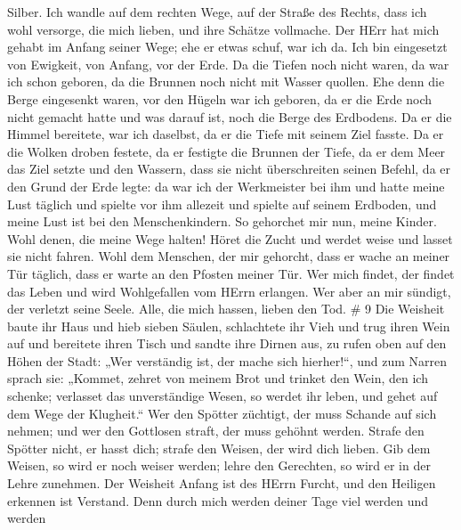 Silber.  Ich wandle auf dem rechten Wege, auf der Straße
des Rechts,  dass ich wohl versorge, die mich lieben, und
ihre Schätze vollmache.  Der HErr hat mich gehabt im Anfang
seiner Wege; ehe er etwas schuf, war ich da.  Ich bin
eingesetzt von Ewigkeit, von Anfang, vor der Erde.  Da die
Tiefen noch nicht waren, da war ich schon geboren, da die Brunnen noch
nicht mit Wasser quollen.  Ehe denn die Berge eingesenkt
waren, vor den Hügeln war ich geboren,  da er die Erde noch
nicht gemacht hatte und was darauf ist, noch die Berge des Erdbodens.
 Da er die Himmel bereitete, war ich daselbst, da er die
Tiefe mit seinem Ziel fasste.  Da er die Wolken droben
festete, da er festigte die Brunnen der Tiefe,  da er dem
Meer das Ziel setzte und den Wassern, dass sie nicht überschreiten
seinen Befehl, da er den Grund der Erde legte:  da war ich
der Werkmeister bei ihm und hatte meine Lust täglich und spielte vor ihm
allezeit  und spielte auf seinem Erdboden, und meine Lust
ist bei den Menschenkindern.  So gehorchet mir nun, meine
Kinder. Wohl denen, die meine Wege halten!  Höret die Zucht
und werdet weise und lasset sie nicht fahren.  Wohl dem
Menschen, der mir gehorcht, dass er wache an meiner Tür täglich, dass er
warte an den Pfosten meiner Tür.  Wer mich findet, der
findet das Leben und wird Wohlgefallen vom HErrn erlangen. 
Wer aber an mir sündigt, der verletzt seine Seele. Alle, die mich
hassen, lieben den Tod. \# 9  Die Weisheit baute ihr Haus
und hieb sieben Säulen,  schlachtete ihr Vieh und trug ihren
Wein auf und bereitete ihren Tisch  und sandte ihre Dirnen
aus, zu rufen oben auf den Höhen der Stadt:  „Wer verständig
ist, der mache sich hierher!{}``, und zum Narren sprach sie:
 „Kommet, zehret von meinem Brot und trinket den Wein, den
ich schenke;  verlasset das unverständige Wesen, so werdet
ihr leben, und gehet auf dem Wege der Klugheit.``  Wer den
Spötter züchtigt, der muss Schande auf sich nehmen; und wer den
Gottlosen straft, der muss gehöhnt werden.  Strafe den
Spötter nicht, er hasst dich; strafe den Weisen, der wird dich lieben.
 Gib dem Weisen, so wird er noch weiser werden; lehre den
Gerechten, so wird er in der Lehre zunehmen.  Der Weisheit
Anfang ist des HErrn Furcht, und den Heiligen erkennen ist Verstand.
 Denn durch mich werden deiner Tage viel werden und werden
